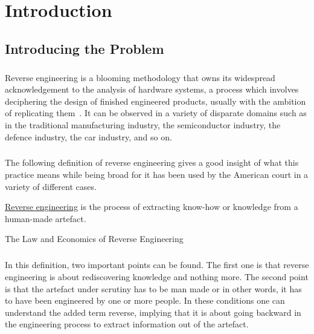 \chapter{Introduction} \label{chapter:introduction}

\section{Introducing the Problem}
\paragraph{}
Reverse engineering is a blooming methodology that owns its widespread acknowledgement to the analysis of hardware systems, a process which involves deciphering the design of finished engineered products, usually with the ambition of replicating them~\cite{6313354}. It can be observed in a variety of disparate domains such as in the traditional manufacturing industry, the semiconductor industry, the defence industry, the car industry, and so on. 

\paragraph{}
The following definition of reverse engineering gives a good insight of what this practice means while being broad for it has been used by the American court in a variety of different cases. 
\begin{framed}
	\begin{definition} 
		\underline{Reverse engineering} is the process of extracting know-how or knowledge from a human-made artefact.
		\begin{flushright}
			\hfill{}{The Law and Economics of Reverse Engineering~\cite{samuelson2002law}}
		\end{flushright}
	\end{definition}
\end{framed}

\paragraph{}
In this definition, two important points can be found. The first one is that reverse engineering is about rediscovering knowledge and nothing more. The second point is that the artefact under scrutiny has to be man made or in other words, it has to have been engineered by one or more people. In these conditions one can understand the added term reverse, implying that it is about going backward in the engineering process to extract information out of the artefact.


